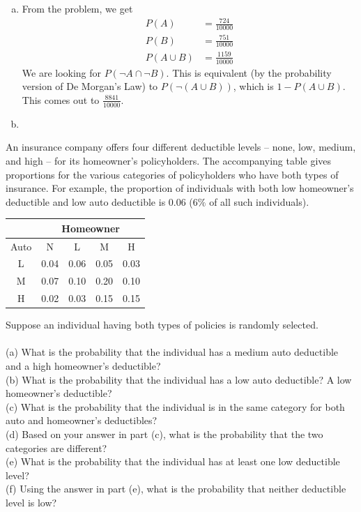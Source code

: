 \documentclass[12pt,letterpaper]{hmcpset}
\begin{document}
\begin{solution}
	\begin{enumerate}[(a)]
		\item From the problem, we get
		\begin{align*}
			P(A) &= \frac{724}{10000} \\
			P(B) &= \frac{751}{10000} \\
			P(A \cup B) &= \frac{1159}{10000}
		\end{align*}
		We are looking for $P(\neg A \cap \neg B)$. This is equivalent (by the probability version of De Morgan's Law) to $P(\neg(A \cup B))$, which is $1 - P(A \cup B)$. This comes out to $\boxed{\tfrac{8841}{10000}}$.
		\item  
	\end{enumerate}
\end{solution}
\newpage
\begin{problem}[2.2.21]
An insurance company offers four different deductible levels -- none, low, medium, and high -- for its homeowner’s policyholders. The accompanying table gives proportions for the various categories of policyholders who have both types of insurance. For example, the proportion of individuals with both low homeowner’s deductible and low auto deductible is 0.06 (6$\%$ of all such individuals).\\
\begin{center}
	\begin{tabular}{|c||c|c|c|c|}
		\hline
		  & \multicolumn{4}{c|}{Homeowner}\\
 		\hline
 		\hline
 		Auto & N & L & M & H \\
 		\hline
 		L & 0.04 & 0.06 & 0.05 & 0.03 \\
 		M & 0.07 & 0.10 & 0.20 & 0.10\\
 		H & 0.02 & 0.03 & 0.15 & 0.15\\
 		 \hline
	 \end{tabular}

\end{center}
Suppose an individual having both types of policies is randomly selected.
\\ \\
(a) What is the probability that the individual has a medium auto deductible and a high homeowner’s deductible?
\\
(b) What is the probability that the individual has a low auto deductible? A low homeowner’s deductible?
\\
(c) What is the probability that the individual is in the same category for both auto and homeowner’s deductibles?
\\
(d) Based on your answer in part (c), what is the probability that the two categories are different?
\\
(e) What is the probability that the individual has at least one low deductible level?
\\
(f) Using the answer in part (e), what is the probability that neither deductible level is low?



\end{problem}
\end{document}
